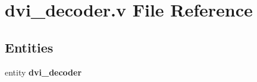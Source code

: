 \section{dvi\-\_\-decoder.\-v File Reference}
\label{dvi__decoder_8v}
\subsection*{Entities}
\begin{DoxyCompactItemize}
\item 
entity {\bf dvi\-\_\-decoder}
\end{DoxyCompactItemize}
